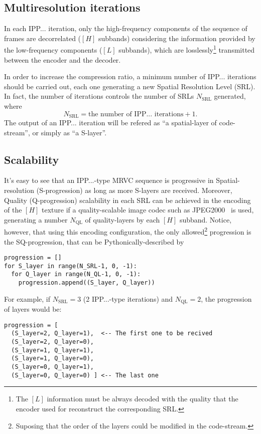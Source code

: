 \subsection{Multiresolution iterations}
In each IPP... iteration, only the high-frequency components of the
sequence of frames are decorrelated ($[H]$ subbands) considering the
information provided by the low-frequency components ($[L]$ subbands),
which are losslessly\footnote{The $[L]$ information must be always
decoded with the quality that the encoder used for reconstruct the
corresponding SRL.} transmitted between the encoder and the decoder.

In order to increase the compression ratio, a minimum number of
IPP... iterations should be carried out, each one generating a new
Spatial Resolution Level (SRL). In fact, the number of iterations
controls the number of SRLs $N_{\text{SRL}}$ generated, where
\begin{equation}
  N_{\text{SRL}} = \text{the number of IPP... iterations} + 1.
\end{equation}
The output of an IPP... iteration will be refered as ``a
spatial-layer of code-stream'', or simply as ``a S-layer''.

\subsection{Scalability}
It's easy to see that an IPP...-type MRVC sequence is progressive in
Spatial-resolution (S-progression) as long as more S-layers are
received. Moreover, Quality (Q-progression) scalability in each SRL
can be achieved in the encoding of the $[H]$ texture if a
quality-scalable image codec such as
JPEG2000~\cite{taubman2002jpeg2000} is used, generating a number
$N_{\text{QL}}$ of quality-layers by each $[H]$ subband. Notice,
however, that using this encoding configuration, the only
allowed\footnote{Suposing that the order of the layers could be
modified in the code-stream.} progression is the SQ-progression, that
can be Pythonically-described by
\begin{verbatim}
progression = []
for S_layer in range(N_SRL-1, 0, -1):
  for Q_layer in range(N_QL-1, 0, -1):
    progression.append((S_layer, Q_layer))
\end{verbatim}

For example, if $N_{\text{SRL}}=3$ (2 IPP...-type iterations) and
$N_{\text{QL}}=2$, the progression of layers would be:
\begin{verbatim}
progression = [
  (S_layer=2, Q_layer=1),  <-- The first one to be recived
  (S_layer=2, Q_layer=0),
  (S_layer=1, Q_layer=1),
  (S_layer=1, Q_layer=0),
  (S_layer=0, Q_layer=1),
  (S_layer=0, Q_layer=0) ] <-- The last one
\end{verbatim}

